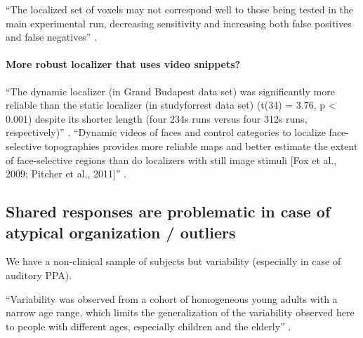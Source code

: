 %
``The localized set of voxels may not correspond well to those being tested in
the main experimental run, decreasing sensitivity and increasing both false
positives and false negatives'' \citep{duncan2009consistency}.



\paragraph{More robust localizer that uses video snippets?}

``The dynamic localizer (in Grand Budapest data set) was significantly more
reliable than the static localizer (in studyforrest data set) (t(34) = 3.76, p <
0.001) despite its shorter length (four 234s runs versus four 312s runs,
respectively)'' \citep{jiahui2020predicting}.
%
``Dynamic videos of faces and control categories to localize face-selective
topographies provides more reliable maps and better estimate the extent of
face-selective regions than do localizers with still image stimuli [Fox et al.,
2009; Pitcher et al., 2011]'' \citep{jiahui2020predicting}.


\subsection{Shared responses are problematic in case of atypical organization /
outliers}





We have a non-clinical sample of subjects but variability (especially in case of
auditory PPA).

``Variability was observed from a cohort of homogeneous young adults with a
narrow age range, which limits the generalization of the variability observed
here to people with different ages, especially children and the elderly''
\citet{zhen2017quantifying}.


